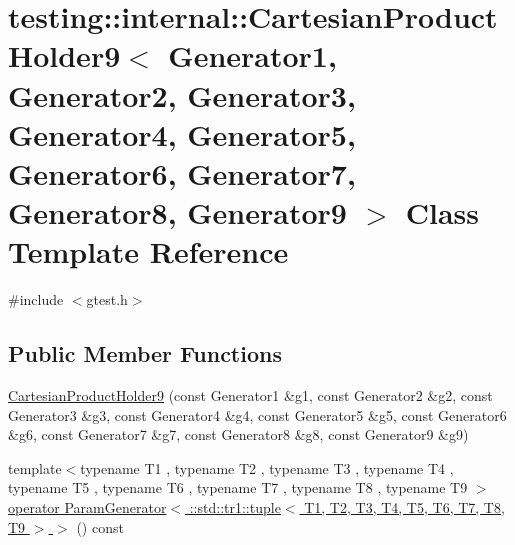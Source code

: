 \hypertarget{classtesting_1_1internal_1_1_cartesian_product_holder9}{\section{testing\-:\-:internal\-:\-:Cartesian\-Product\-Holder9$<$ Generator1, Generator2, Generator3, Generator4, Generator5, Generator6, Generator7, Generator8, Generator9 $>$ Class Template Reference}
\label{classtesting_1_1internal_1_1_cartesian_product_holder9}
}


{\ttfamily \#include $<$gtest.\-h$>$}

\subsection*{Public Member Functions}
\begin{DoxyCompactItemize}
\item 
\hyperlink{classtesting_1_1internal_1_1_cartesian_product_holder9_a692a537863ab6adfc4001564887a3bc7}{Cartesian\-Product\-Holder9} (const Generator1 \&g1, const Generator2 \&g2, const Generator3 \&g3, const Generator4 \&g4, const Generator5 \&g5, const Generator6 \&g6, const Generator7 \&g7, const Generator8 \&g8, const Generator9 \&g9)
\item 
{\footnotesize template$<$typename T1 , typename T2 , typename T3 , typename T4 , typename T5 , typename T6 , typename T7 , typename T8 , typename T9 $>$ }\\\hyperlink{classtesting_1_1internal_1_1_cartesian_product_holder9_a95a8b77d353f37fb895ac673408d4b0b}{operator Param\-Generator$<$ \-::std\-::tr1\-::tuple$<$ T1, T2, T3, T4, T5, T6, T7, T8, T9 $>$ $>$} () const 
\end{DoxyCompactItemize}


